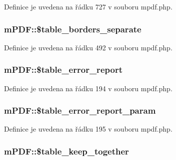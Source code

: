 Definice je uvedena na řádku 727 v souboru mpdf.\-php.

\hypertarget{classm_p_d_f_a9b56d4f2f60603c2845d063da372b05a}{
\subsubsection[{\$table\-\_\-borders\-\_\-separate}]{\setlength{\rightskip}{0pt plus 5cm}m\-P\-D\-F\-::\$table\-\_\-borders\-\_\-separate}}\label{classm_p_d_f_a9b56d4f2f60603c2845d063da372b05a}


Definice je uvedena na řádku 492 v souboru mpdf.\-php.

\hypertarget{classm_p_d_f_a2777710f7d2c724ee1ae8575a82528ce}{
\subsubsection[{\$table\-\_\-error\-\_\-report}]{\setlength{\rightskip}{0pt plus 5cm}m\-P\-D\-F\-::\$table\-\_\-error\-\_\-report}}\label{classm_p_d_f_a2777710f7d2c724ee1ae8575a82528ce}


Definice je uvedena na řádku 194 v souboru mpdf.\-php.

\hypertarget{classm_p_d_f_abfb3be2ce3f90e1b9052ea2ffc28930e}{
\subsubsection[{\$table\-\_\-error\-\_\-report\-\_\-param}]{\setlength{\rightskip}{0pt plus 5cm}m\-P\-D\-F\-::\$table\-\_\-error\-\_\-report\-\_\-param}}\label{classm_p_d_f_abfb3be2ce3f90e1b9052ea2ffc28930e}


Definice je uvedena na řádku 195 v souboru mpdf.\-php.

\hypertarget{classm_p_d_f_a03e66eea103428fe47f303f36113348e}{
\subsubsection[{\$table\-\_\-keep\-\_\-together}]{\setlength{\rightskip}{0pt plus 5cm}m\-P\-D\-F\-::\$table\-\_\-keep\-\_\-together}}\label{classm_p_d_f_a03e66eea103428fe47f303f36113348e}


